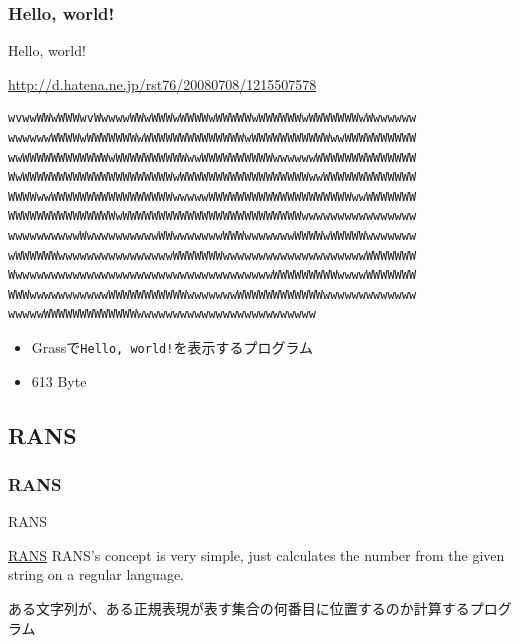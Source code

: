\documentclass[12pt, unicode, svgnames]{beamer}
\begin{document}
\begin{frame}[fragile]
  \frametitle{Hello, world!}

  \begin{exampleblock}{Hello, world!}
    \begin{shadequote}[r]{\scriptsize\url{http://d.hatena.ne.jp/rst76/20080708/1215507578}}
\begin{lstlisting}[style=grass]
wvwwWWwWWWwvWwwwwWWwWWWwWWWWwWWWWWwWWWWWWwWWWWWWWwWwwwwww
wwwwwwWWWWwWWWWWWWwWWWWWWWWWWWWWWwWWWWWWWWWWWwwWWWWWWWWWW
wwWWWWWWWWWWWWwWWWWWWWWWWwwWWWWWWWWWWwwwwwwWWWWWWWWWWWWWW
WwWWWWWWWWWWWWWWWWWWWWWwWWWWWWWWWWWWWWWWWWwwWWWWWWWWWWWWW
WWWWwwWWWWWWWWWWWWWWWWWwwwwwWWWWWWWWWWWWWWWWWWWWwwWWWWWWW
WWWWWWWWWWWWWWWwWWWWWWWWWWWWWWWWWWWWWWWWWwwwwwwwwwwwwwwww
wwwwwwwwwwWwwwwwwwwwwWWwwwwwwwWWWwwwwwwwWWWWwWWWWWwwwwwww
wWWWWWWwwwwwwwwwwwwwwwwWWWWWWWwwwwwwwwwwwwwwwwwwwwWWWWWWW
WwwwwwwwwwwwwwwwwwwwwwwwwwwwwwwwwwwwwWWWWWWWWWwwwwWWWWWWW
WWWwwwwwwwwwwwWWWWWWWWWWWwwwwwwwWWWWWWWWWWWWwwwwwwwwwwwww
wwwwwWWWWWWWWWWWWWwwwwwwwwwwwwwwwwwwwwwwwww
\end{lstlisting}
    \end{shadequote}
  \end{exampleblock}

  \begin{itemize}
    \item<2-> Grassで\texttt{Hello, world!}を表示するプログラム
    \item<3-> 613 Byte
  \end{itemize}
\end{frame}

\subsection{RANS}
\begin{frame}[fragile]
  \frametitle{RANS}

  \begin{block}{RANS}
    \begin{shadequote}[r]{\scriptsize\href{http://sinya8282.github.io/RANS/}{RANS}}
      RANS's concept is very simple, just calculates the number from the given string on a regular language.
    \end{shadequote}
  \end{block}

   {
    ある文字列が、ある正規表現が表す集合の何番目に位置するのか計算するプログラム
  }
\end{frame}
\end{document}
